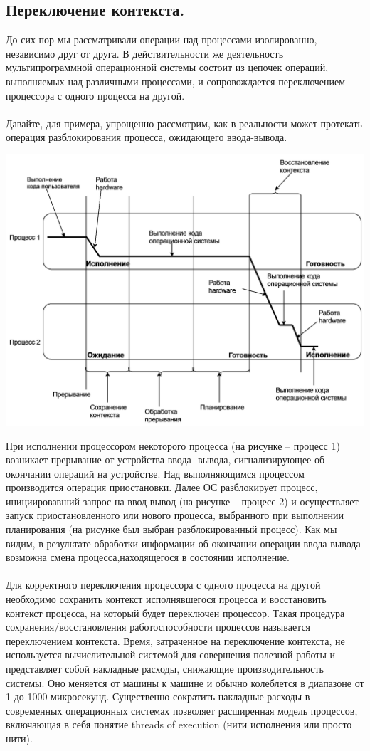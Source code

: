 \documentclass[a4paper]{article}
\begin{document}
\subsection{\Large Переключение контекста.}
До сих пор мы рассматривали операции над процессами изолированно, независимо друг от друга. В действительности же деятельность мультипрограммной операционной системы состоит из цепочек операций, выполняемых над различными процессами, и сопровождается переключением процессора с одного процесса на другой.\\\\
Давайте, для примера, упрощенно рассмотрим, как в реальности может протекать операция разблокирования процесса, ожидающего ввода-вывода.
\begin{center}
  \includegraphics[width = 16cm]{os.png}
\end{center}
При исполнении процессором некоторого процесса (на рисунке – процесс 1) возникает прерывание от устройства ввода- вывода, сигнализирующее об окончании операций на устройстве. Над выполняющимся процессом производится операция приостановки. Далее ОС разблокирует процесс, инициировавший запрос на ввод-вывод (на рисунке – процесс 2) и осуществляет запуск приостановленного или нового процесса, выбранного при выполнении планирования (на рисунке был выбран разблокированный процесс). Как мы видим, в результате обработки информации об окончании операции ввода-вывода возможна смена процесса,находящегося в состоянии исполнение.\\\\
Для корректного переключения процессора с одного процесса на другой необходимо сохранить контекст исполнявшегося процесса и восстановить контекст процесса, на который будет переключен процессор. Такая процедура сохранения/восстановления работоспособности процессов называется переключением контекста. Время, затраченное на переключение контекста, не используется вычислительной системой для совершения полезной работы и представляет собой накладные расходы, снижающие производительность системы. Оно меняется от машины к машине и обычно колеблется в диапазоне от 1 до 1000 микросекунд. Существенно сократить накладные расходы в современных операционных системах позволяет расширенная модель процессов, включающая в себя понятие threads of execution (нити исполнения или просто нити).
\end{document}
